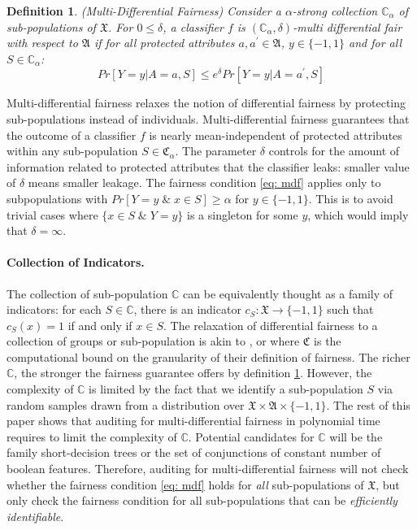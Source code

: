 \documentclass{article}
\newtheorem{defn}{Definition}[section]
\begin{document}
\begin{defn}(Multi-Differential Fairness)
\label{def: mdf}
Consider a $\alpha$-strong collection $\mathbb{C}_{\alpha}$ of sub-populations of $\mathfrak{X}$. For $0\leq \delta$, a classifier $f$ is $(\mathbb{C}_{\alpha}, \delta)$-multi differential fair with respect to $\mathfrak{A}$ if for all protected attributes $a, a^{'}\in \mathfrak{A}$, $y\in\{-1, 1\}$ and for all $S\in \mathbb{C}_{\alpha}$:
\begin{equation}
\label{eq: mdf}
Pr[Y=y|A=a, S] \leq e^{\delta} Pr[Y=y|A=a^{'}, S]
\end{equation}
\end{defn}

Multi-differential fairness relaxes the notion of differential fairness by protecting sub-populations instead of individuals. Multi-differential fairness guarantees that the outcome of a classifier $f$ is nearly mean-independent of protected attributes within any sub-population $S\in \mathfrak{C}_{\alpha}$. The parameter $\delta$ controls for the amount of information related to protected attributes that the classifier leaks: smaller value of $\delta$ means smaller leakage. The fairness condition \ref{eq: mdf} applies only to subpopulations with $Pr[Y=y \;\&\; x\in S] \geq \alpha$ for $y\in\{-1, 1\}$. This is to avoid trivial cases where $\{x\in S \; \& \; Y=y\}$ is a singleton for some $y$, which would imply that $\delta=\infty$. 


\paragraph{Collection of Indicators.}
The collection of sub-population $\mathbb{C}$ can be equivalently thought as a family of indicators: for each $S\in \mathbb{C}$, there is an indicator $c_{S}: \mathfrak{X}\rightarrow \{-1, 1\}$ such that $c_{S}(x)=1$ if and only if $x\in S$. The relaxation of differential fairness to a collection of groups or sub-population is akin to \cite{kim2018fairness}, \cite{kearns2017preventing} or \cite{hebert2017calibration} where $\mathfrak{C}$ is the computational bound on the granularity of their definition of fairness. The richer $\mathbb{C}$, the stronger the fairness guarantee offers by definition \ref{def: mdf}. However, the complexity of $\mathbb{C}$ is limited by the fact that we identify a sub-population $S$ via random samples drawn from a distribution over $\mathfrak{X} \times \mathfrak{A}\times \{-1, 1\}$. The rest of this paper shows that auditing for multi-differential fairness in polynomial time requires to limit the complexity of $\mathbb{C}$. Potential candidates for $\mathbb{C}$ will be the family short-decision trees or the set of conjunctions of constant number of boolean features. Therefore, auditing for multi-differential fairness will not check whether the fairness condition \eqref{eq: mdf} holds for \textit{all} sub-populations of $\mathfrak{X}$, but only check  the fairness condition for all sub-populations that can be \textit{efficiently identifiable}. 
\end{document}
